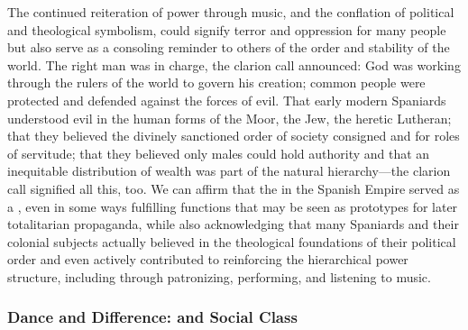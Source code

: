 The continued reiteration of power through music, and the conflation of
political and theological symbolism, could signify terror and oppression for
many people but also serve as a consoling reminder to others of the order and
stability of the world.
The right man was in charge, the clarion call announced: God was working
through the rulers of the world to govern his creation; common people were
protected and defended against the forces of evil.
That early modern Spaniards understood evil in the human forms of the Moor, the
Jew, the heretic Lutheran;
that they believed the divinely sanctioned order of society consigned
 and  for roles of servitude; 
that they believed only males could hold authority and that
an inequitable distribution of wealth was part of the natural hierarchy---the
clarion call signified all this, too.
We can affirm that the  in the Spanish Empire served as
a , even in some ways fulfilling functions that
may be seen as prototypes for later totalitarian propaganda, while also
acknowledging that many Spaniards and their colonial subjects actually believed
in the theological foundations of their political order and even actively
contributed to reinforcing the hierarchical power structure, including through
patronizing, performing, and listening to music.%
    \citXXX[Rodriguez, Sage, Rietbergen, Menache, etc]

\subsubsection{Dance and Difference:  and Social Class}

